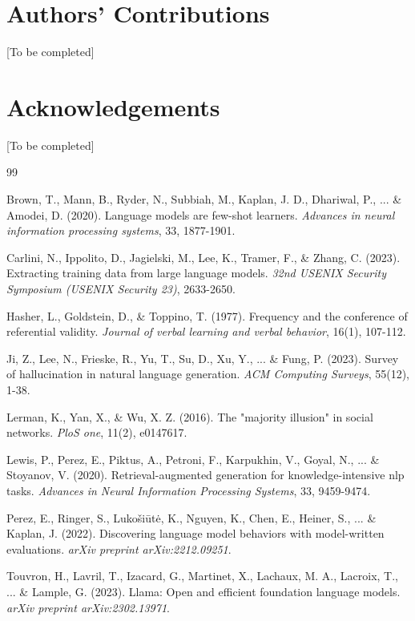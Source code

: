 \documentclass{article}
\begin{document}
\section*{Authors' Contributions}
[To be completed]

\section*{Acknowledgements}
[To be completed]

\begin{thebibliography}{99}

Brown, T., Mann, B., Ryder, N., Subbiah, M., Kaplan, J. D., Dhariwal, P., ... \& Amodei, D. (2020). Language models are few-shot learners. \textit{Advances in neural information processing systems}, 33, 1877-1901.

Carlini, N., Ippolito, D., Jagielski, M., Lee, K., Tramer, F., \& Zhang, C. (2023). Extracting training data from large language models. \textit{32nd USENIX Security Symposium (USENIX Security 23)}, 2633-2650.

Hasher, L., Goldstein, D., \& Toppino, T. (1977). Frequency and the conference of referential validity. \textit{Journal of verbal learning and verbal behavior}, 16(1), 107-112.

Ji, Z., Lee, N., Frieske, R., Yu, T., Su, D., Xu, Y., ... \& Fung, P. (2023). Survey of hallucination in natural language generation. \textit{ACM Computing Surveys}, 55(12), 1-38.

Lerman, K., Yan, X., \& Wu, X. Z. (2016). The "majority illusion" in social networks. \textit{PloS one}, 11(2), e0147617.

Lewis, P., Perez, E., Piktus, A., Petroni, F., Karpukhin, V., Goyal, N., ... \& Stoyanov, V. (2020). Retrieval-augmented generation for knowledge-intensive nlp tasks. \textit{Advances in Neural Information Processing Systems}, 33, 9459-9474.

Perez, E., Ringer, S., Lukošiūtė, K., Nguyen, K., Chen, E., Heiner, S., ... \& Kaplan, J. (2022). Discovering language model behaviors with model-written evaluations. \textit{arXiv preprint arXiv:2212.09251}.

Touvron, H., Lavril, T., Izacard, G., Martinet, X., Lachaux, M. A., Lacroix, T., ... \& Lample, G. (2023). Llama: Open and efficient foundation language models. \textit{arXiv preprint arXiv:2302.13971}.


\end{thebibliography}
\end{document}
